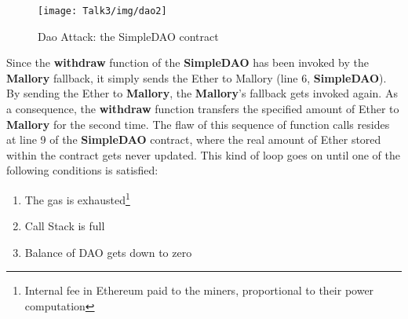 \begin{figure}[H]
\begin{center}
\texttt{[image: Talk3/img/dao2]}
\end{center}
\caption{Dao Attack: the SimpleDAO contract}
\label{label}
\end{figure}
Since the \textbf{withdraw} function of the \textbf{SimpleDAO} has been invoked by the \textbf{Mallory} fallback, it simply sends the Ether to Mallory (line 6, \textbf{SimpleDAO}). By sending the Ether to \textbf{Mallory}, the \textbf{Mallory}'s fallback gets invoked again. As a consequence, the \textbf{withdraw} function transfers the specified amount of Ether to \textbf{Mallory} for the second time. The flaw of this sequence of function calls resides at line 9 of the \textbf{SimpleDAO} contract, where the real amount of Ether stored within the contract gets never updated. 
This kind of loop goes on until one of the following conditions is satisfied: \\
\begin{enumerate}
\item The gas is exhausted\footnote{Internal fee in Ethereum paid to the miners, proportional to their power computation\cite{SC11}}
\item Call Stack is full
\item Balance of DAO gets down to zero  
\end{enumerate}





